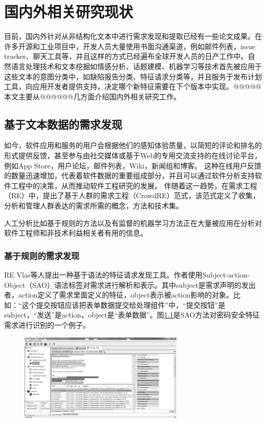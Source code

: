 \chapter{国内外相关研究现状}\label{chap:related_work}

目前，国内外针对从非结构化文本中进行需求发现和提取已经有一些论文成果。在许多开源和工业项目中，开发人员大量使用书面沟通渠道，例如邮件列表，issue tracker、聊天工具等，并且这样的方式已经遍布全球开发人员的日产工作中。自然语言处理技术和文本挖掘如情感分析、话题建模、机器学习等技术首先被应用于这些文本的意图分类中，如缺陷报告分类、特征请求分类等\cite{maalej2015bug}，并且服务于发布计划工具，向应用开发者提供支持，决定哪个新特征需要在下个版本中实现。@@@@@本文主要从@@@@@@几方面介绍国内外相关研究工作。

\section{基于文本数据的需求发现}
如今，软件应用和服务的用户会根据他们的感知体验质量，以简短的评论和排名的形式提供反馈，甚至参与由社交媒体或基于Web的专用交流支持的在线讨论平台，例如App Store，用户论坛，邮件列表，Wiki，新闻组和博客。 这种在线用户反馈的数量迅速增加，代表着软件数据的重要组成部分，并且可以通过软件分析支持软件工程中的决策，从而推动软件工程研究的发展\cite{Morales2019Speech}。 
伴随着这一趋势，在需求工程（RE）中，提出了基于人群的需求工程（CrowdRE）\cite{groen2017crowd}范式，该范式定义了收集，分析和管理人群表达的需求所需的概念，方法和技术集。

人工分析比如基于规则的方法以及有监督的机器学习方法正在大量被应用在分析对软件工程师和非技术利益相关者有用的信息\cite{Morales2019Speech}。
\subsection{基于规则的需求发现}

RE Vlas等人\cite{morales2014discovering}提出一种基于语法的特征请求发现工具。作者使用Subject-action-Object（SAO）语法标签对需求进行解析和表示。其中subject是需求声明的发出者，action定义了需求里面定义的特征，object表示被action影响的对象。比如：“这个提交按钮应该把表单数据提交给处理组件”中，“提交按钮”是subject，“发送”是action，object是“表单数据”。图\ref{fig:sao}是SAO方法对密码安全特征需求进行识别的一个例子。
\begin{figure}[htbp]
    \centering
    \includegraphics[width=0.70\textwidth]{Img/sao.png}
    \label{fig:sao}
\end{figure}


